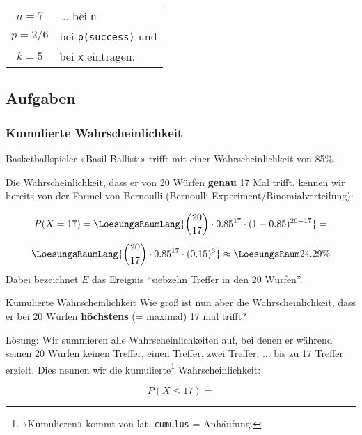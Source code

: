 \begin{tabular}{c@{ $:$ }l}
  $n=7$   & ... bei \texttt{n} \\
  $p=2/6$ & bei \texttt{p(success)} und \\
  $k=5$   & bei \texttt{x} eintragen.
\end{tabular} 



\subsection*{Aufgaben}



\newpage
\subsubsection{Kumulierte Wahrscheinlichkeit}

Basketballspieler «Basil Ballisti» trifft mit einer
Wahrscheinlichkeit von 85\%.

Die Wahrscheinlichkeit, dass er von 20 Würfen \textbf{genau} 17 Mal trifft, kennen wir
bereits von der Formel von Bernoulli (Bernoulli-Experiment/Binomialverteilung):

$$P(X=17) = \LoesungsRaumLang{{20 \choose 17}\cdot 0.85^{17}\cdot(1-0.85)^{20-17}}=$$
$$\LoesungsRaumLang{{20 \choose 17}\cdot 0.85^{17}\cdot (0.15)^{3}}\approx{}\LoesungsRaum{24.29\%}$$
Dabei bezeichnet $E$ das Ereignis ``siebzehn Treffer in den 20 Würfen''.

\begin{beispiel}{Kumulierte Wahrscheinlichkeit}{}
Wie groß ist nun aber die Wahrscheinlichkeit, dass er bei 20 Würfen
\textbf{höchstens} (= maximal)  17 mal trifft?
\end{beispiel}


Lösung: Wir summieren alle Wahrscheinlichkeiten auf, bei denen er
während seinen 20 Würfen
keinen Treffer, einen Treffer, zwei Treffer, ... bis zu 17 Treffer
erzielt. Dies nennen wir die kumulierte\footnote{«Kumulieren» kommt von
  lat. \texttt{cumulus} = Anhäufung.} Wahrscheinlichkeit:

$$P(X\le 17) = $$

